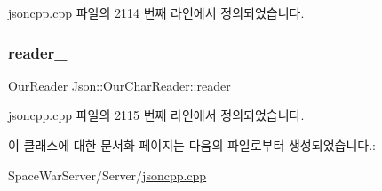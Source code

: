 jsoncpp.\+cpp 파일의 2114 번째 라인에서 정의되었습니다.

\mbox{\label{class_json_1_1_our_char_reader_aedd4520b8570654ed7aa0726075ee58d}} 
\subsubsection{\texorpdfstring{reader\+\_\+}{reader\_}}
{\footnotesize\ttfamily \hyperlink{class_json_1_1_our_reader}{Our\+Reader} Json\+::\+Our\+Char\+Reader\+::reader\+\_\+\hspace{0.3cm}{\ttfamily [private]}}



jsoncpp.\+cpp 파일의 2115 번째 라인에서 정의되었습니다.



이 클래스에 대한 문서화 페이지는 다음의 파일로부터 생성되었습니다.\+:\begin{DoxyCompactItemize}
\item 
Space\+War\+Server/\+Server/\hyperlink{jsoncpp_8cpp}{jsoncpp.\+cpp}\end{DoxyCompactItemize}
